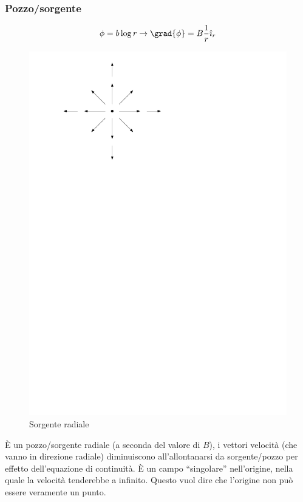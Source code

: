 \subsubsection{Pozzo/sorgente}
%
	\begin{equation*}
		\phi = b \log{r} \rightarrow \grad{\phi} = B \frac{1}{r} \hat{\imath}_r
	\end{equation*}
	\begin{figure}[ht]
		\includegraphics[scale=0.7]{./7.3 Flusso irrotazionale/7.3-3}
		\centering
		\caption{Sorgente radiale}
	\end{figure}
%
È un pozzo/sorgente radiale (a seconda del valore di $B$), i vettori velocità (che vanno in direzione radiale) diminuiscono all'allontanarsi da sorgente/pozzo per effetto dell'equazione di continuità.
È un campo ``singolare'' nell'origine, nella quale la velocità tenderebbe a infinito.
Questo vuol dire che l'origine non può essere veramente un punto.

